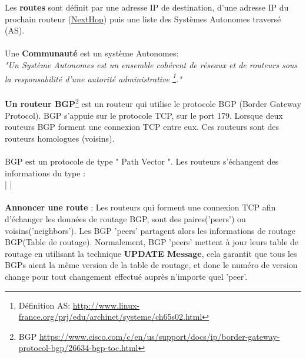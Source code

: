 Les \textbf{routes} sont définit par une adresse IP de destination, d'une adresse IP du prochain routeur (\underline{NextHop}) puis une liste des Systèmes Autonomes traversé (AS).
\\
\\
Une \textbf{Communauté} est un système Autonomes:\\
\textit{"Un Système Autonomes est un ensemble cohérent de réseaux et de routeurs sous la responsabilité d'une autorité administrative \footnote{Définition AS:  \url{http://www.linux-france.org/prj/edu/archinet/systeme/ch65s02.html}}."}
\\
\\
\textbf{Un routeur BGP}\footnote{BGP \url{https://www.cisco.com/c/en/us/support/docs/ip/border-gateway-protocol-bgp/26634-bgp-toc.html}} est un routeur qui utilise le protocole BGP (Border Gateway Protocol). BGP s'appuie sur le protocole TCP, sur le port 179. Lorsque deux routeurs BGP forment une connexion TCP entre eux. Ces routeurs sont des routeurs homologues (voisins). 
\\
\\
BGP est un protocole de type " Path Vector ". Les routeurs s'échangent des informations du type :
\\
 |
 |
\\
\\
\textbf{Annoncer une route} :
\newline
Les routeurs qui forment une connexion TCP afin d'échanger les données de routage BGP, sont des paires('peers') ou voisins('neighbors'). Les BGP 'peers' partagent alors les informations de routage BGP(Table de routage).\newline
Normalement,  BGP 'peers' mettent à jour leurs table de routage en utilisant la technique \textbf{UPDATE Message}, cela garantit que tous les BGPs aient la même version de la table de routage, et donc le numéro de version change pour tout changement effectué auprès n'importe quel 'peer'.

